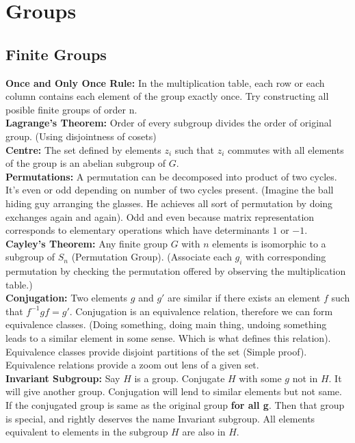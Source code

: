 \documentclass{report}
\begin{document}
\chapter{Groups}

\section{Finite Groups}

\noindent\textbf{Once and Only Once Rule:} In the multiplication table, each row or each column contains each element of the group exactly once. Try constructing all posible finite groups of order n.\\

\noindent\textbf{Lagrange's Theorem:} Order of every subgroup divides the order of original group. (Using disjointness of cosets)\\

\noindent\textbf{Centre:} The set defined by elements $z_i$ such that $z_i$ commutes with all elements of the group is an abelian subgroup of $G$.\\

\noindent\textbf{Permutations:} A permutation can be decomposed into product of two cycles. It's even or odd depending on number of two cycles present. (Imagine the ball hiding guy arranging the glasses. He achieves all sort of permutation by doing exchanges again and again). Odd and even because matrix representation corresponds to elementary operations which have determinants $1$ or $-1$.\\

\noindent\textbf{Cayley's Theorem:} Any finite group $G$ with $n$ elements is isomorphic to a subgroup of $S_n$ (Permutation Group). (Associate each $g_i$ with corresponding permutation by checking the permutation offered by observing the multiplication table.)\\

\noindent\textbf{Conjugation:} Two elements $g$ and $g'$ are similar if there exists an element $f$ such that $f^{-1}gf = g'$. Conjugation is an equivalence relation, therefore we can form equivalence classes. (Doing something, doing main thing, undoing something leads to a similar element in some sense. Which is what defines this relation). Equivalence classes provide disjoint partitions of the set (Simple proof). Equivalence relations provide a zoom out lens of a given set.\\

\noindent\textbf{Invariant Subgroup:} Say $H$ is a group. Conjugate $H$ with some $g$ not in $H$. It will give another group. Conjugation will lend to similar elements but not same. If the conjugated group is same as the original group \textbf{for all g}. Then that group is special, and rightly deserves the name Invariant subgroup. All elements equivalent to elements in the subgroup $H$ are also in $H$.\\
\end{document}
